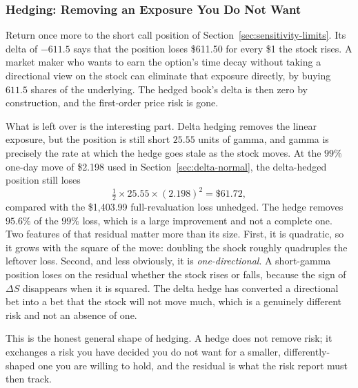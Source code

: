 \documentclass[../ai_in_finance]{subfiles}
\begin{document}
\subsubsection*{Hedging: Removing an Exposure You Do Not Want}

Return once more to the short call position of Section~\ref{sec:sensitivity-limits}. Its delta of $-611.5$ says that the position loses \$611.50 for every \$1 the stock rises. A market maker who wants to earn the option's time decay without taking a directional view on the stock can eliminate that exposure directly, by buying $611.5$ shares of the underlying. The hedged book's delta is then zero by construction, and the first-order price risk is gone.

What is left over is the interesting part. Delta hedging removes the linear exposure, but the position is still short $25.55$ units of gamma, and gamma is precisely the rate at which the hedge goes stale as the stock moves. At the $99\%$ one-day move of \$2.198 used in Section~\ref{sec:delta-normal}, the delta-hedged position still loses
\begin{equation*}
\tfrac{1}{2} \times 25.55 \times (2.198)^2 = \$61.72,
\end{equation*}
compared with the \$1,403.99 full-revaluation loss unhedged. The hedge removes $95.6\%$ of the $99\%$ loss, which is a large improvement and not a complete one. Two features of that residual matter more than its size. First, it is quadratic, so it grows with the square of the move: doubling the shock roughly quadruples the leftover loss. Second, and less obviously, it is \emph{one-directional}. A short-gamma position loses on the residual whether the stock rises or falls, because the sign of $\Delta S$ disappears when it is squared. The delta hedge has converted a directional bet into a bet that the stock will not move much, which is a genuinely different risk and not an absence of one.

This is the honest general shape of hedging. A hedge does not remove risk; it exchanges a risk you have decided you do not want for a smaller, differently-shaped one you are willing to hold, and the residual is what the risk report must then track.
\end{document}

